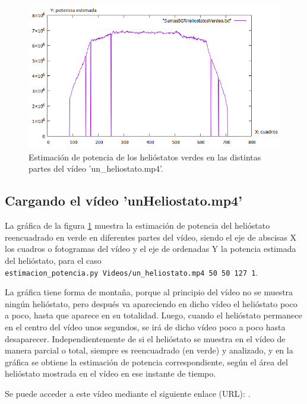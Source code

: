 \begin{figure}[h!]
  	\centering
	\includegraphics[width=\textwidth]{ValidacionCualitativaFuncionEstimacionPotencia/SumasBGRHeliostatosVerdesVideo3.png}
	\caption{Estimación de potencia de los helióstatos verdes en las distintas partes del vídeo 'un\_heliostato.mp4'.
	\label{fig:ValidacionCualitativaFuncionEstimacionPotencia/SumasBGRHeliostatosVerdesVideo3.png}}
\end{figure}

\subsection{Cargando el vídeo 'unHeliostato.mp4'}

La gráfica de la figura \ref{fig:ValidacionCualitativaFuncionEstimacionPotencia/SumasBGRHeliostatosVerdesVideo3.png} muestra la estimación de potencia del helióstato reencuadrado en verde en diferentes partes del vídeo, siendo el eje de abscisas X los cuadros o fotogramas del vídeo y el eje de ordenadas Y la potencia estimada del helióstato, para el caso\\ \verb|estimacion_potencia.py Videos/un_heliostato.mp4 50 50 127 1|.

La gráfica tiene forma de montaña, porque al principio del vídeo no se muestra ningún helióstato, pero después va apareciendo en dicho vídeo el helióstato poco a poco, hasta que aparece en su totalidad. Luego, cuando el helióstato permanece en el centro del vídeo unos segundos, se irá de dicho vídeo poco a poco hasta desaparecer. Independientemente de si el helióstato se muestra en el vídeo de manera parcial o total, siempre es reencuadrado (en verde) y analizado, y en la gráfica se obtiene la estimación de potencia correspondiente, según el área del helióstato mostrada en el vídeo en ese instante de tiempo.

Se puede acceder a este vídeo mediante el siguiente enlace (URL): \cite{VideoHeliostatos}.
